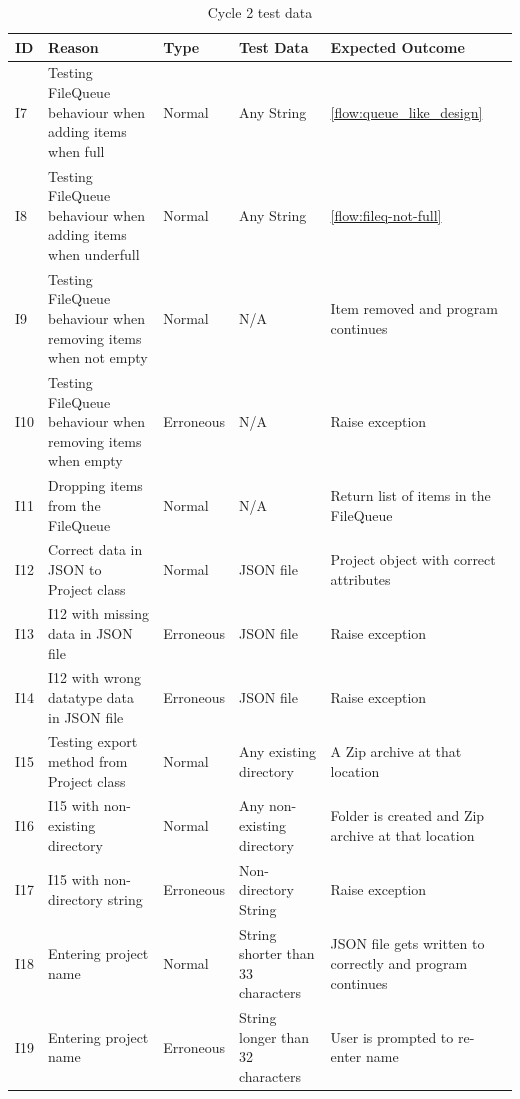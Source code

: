 \documentclass[11pt]{article}
\begin{document}
        \newpage
        \begin{table}[!h]
            \centering
            \begin{tabular}{@{}lp{150pt}lp{87pt}p{110pt}@{}} \toprule
                \textbf{ID} & \textbf{Reason} & \textbf{Type} & \textbf{Test Data} & \textbf{Expected Outcome} \\ \midrule 
                I7 & Testing FileQueue behaviour when adding items when full & Normal & Any String & \autoref{flow:queue_like_design} \\ 
                I8 & Testing FileQueue behaviour when adding items when underfull & Normal & Any String & \autoref{flow:fileq-not-full} \\ 
                I9 & Testing FileQueue behaviour when removing items when not empty & Normal & N/A & Item removed and program continues \\ 
                I10 & Testing FileQueue behaviour when removing items when empty & Erroneous & N/A & Raise exception \\ 
                I11 & Dropping items from the FileQueue & Normal & N/A & Return list of items in the FileQueue \\ 
                I12 & Correct data in JSON to Project class & Normal & JSON file & Project object with correct attributes \\ 
                I13 & I12 with missing data in JSON file & Erroneous & JSON file & Raise exception \\ 
                I14 & I12 with wrong datatype data in JSON file & Erroneous & JSON file & Raise exception \\ 
                I15 & Testing export method from Project class & Normal & Any existing directory & A Zip archive at that location \\ 
                I16 & I15 with non-existing directory & Normal & Any non-existing directory & Folder is created and Zip archive at that location \\ 
                I17 & I15 with non-directory string & Erroneous & Non-directory String & Raise exception \\ 
                I18 & Entering project name & Normal & String shorter than 33 characters & JSON file gets written to correctly and program continues \\ 
                I19 & Entering project name & Erroneous & String longer than 32 characters & User is prompted to re-enter name \\ 
                \bottomrule
            \end{tabular}
            \caption{Cycle 2 test data}
            \label{tbl:test-data-cycle2}
        \end{table}
        
\end{document}
